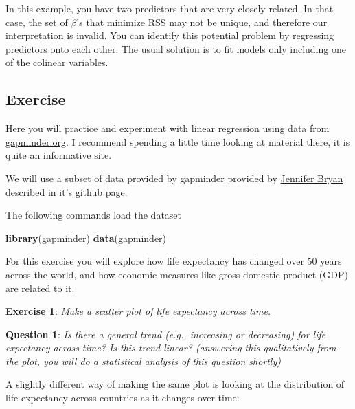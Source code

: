 \documentclass[]{article}
\newenvironment{Shaded}{\begin{snugshade}}{\end{snugshade}}
\newcommand{\KeywordTok}[1]{\textcolor[rgb]{0.13,0.29,0.53}{\textbf{{#1}}}}
\newcommand{\DataTypeTok}[1]{\textcolor[rgb]{0.13,0.29,0.53}{{#1}}}
\newcommand{\StringTok}[1]{\textcolor[rgb]{0.31,0.60,0.02}{{#1}}}
\newcommand{\NormalTok}[1]{{#1}}
\theoremstyle{definition}
\theoremstyle{definition}
\theoremstyle{remark}
\begin{document}
In this example, you have two predictors that are very closely related.
In that case, the set of \(\beta\)'s that minimize RSS may not be
unique, and therefore our interpretation is invalid. You can identify
this potential problem by regressing predictors onto each other. The
usual solution is to fit models only including one of the colinear
variables.

\subsection{Exercise}\label{exercise-2}

Here you will practice and experiment with linear regression using data
from \href{http://gapminder.org}{gapminder.org}. I recommend spending a
little time looking at material there, it is quite an informative site.

We will use a subset of data provided by gapminder provided by
\href{http://www.stat.ubc.ca/~jenny/}{Jennifer Bryan} described in it's
\href{https://github.com/jennybc/gapminder}{github page}.

The following commands load the dataset

\begin{Shaded}
\begin{Highlighting}[]
\KeywordTok{library}\NormalTok{(gapminder)}
\KeywordTok{data}\NormalTok{(gapminder)}
\end{Highlighting}
\end{Shaded}

For this exercise you will explore how life expectancy has changed over
50 years across the world, and how economic measures like gross domestic
product (GDP) are related to it.

\textbf{Exercise 1}: \emph{Make a scatter plot of life expectancy across
time.}

\textbf{Question 1}: \emph{Is there a general trend (e.g., increasing or
decreasing) for life expectancy across time? Is this trend linear?
(answering this qualitatively from the plot, you will do a statistical
analysis of this question shortly)}

A slightly different way of making the same plot is looking at the
distribution of life expectancy across countries as it changes over
time:

\begin{Shaded}
\end{Shaded}
\end{document}
